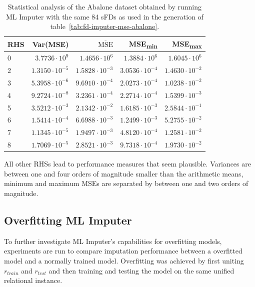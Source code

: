 \begin{table}[ht]
    \centering
    \begin{tabular}{lrrrr}
        \toprule
        \toprule
        RHS & Var(MSE) & \( \overline{\text{MSE}} \) & MSE\textsubscript{min} & MSE\textsubscript{max} \\
        \midrule
        0 & \(3.7736 \cdot 10^{9} \) & \(1.4656 \cdot 10^{6} \) & \(1.3884 \cdot 10^{6} \) & \(1.6045 \cdot 10^{6} \) \\
        2 & \( 1.3150 \cdot 10^{-5} \) & \( 1.5828 \cdot 10^{-3} \) & \( 3.0536 \cdot 10^{-4} \) & \( 1.4630 \cdot 10^{-2} \) \\
        3 & \( 5.3958 \cdot 10^{-6} \) & \( 9.6910 \cdot 10^{-4} \) & \( 2.0273 \cdot 10^{-4} \) & \( 1.0238 \cdot 10^{-2} \) \\
        4 & \( 9.2724 \cdot 10^{-8} \) & \( 3.2361 \cdot 10^{-4} \) & \( 2.2714 \cdot 10^{-4} \) & \( 1.5399 \cdot 10^{-3} \) \\
        5 & \( 3.5212 \cdot 10^{-3} \) & \( 2.1342 \cdot 10^{-2} \) & \( 1.6185 \cdot 10^{-3} \) & \( 2.5844 \cdot 10^{-1} \) \\
        6 & \( 1.5414 \cdot 10^{-4} \) & \( 6.6988 \cdot 10^{-3} \) & \( 1.2499 \cdot 10^{-3} \) & \( 5.2755 \cdot 10^{-2} \) \\
        7 & \( 1.1345 \cdot 10^{-5} \)& \( 1.9497 \cdot 10^{-3} \) & \( 4.8120 \cdot 10^{-4} \) & \( 1.2581 \cdot 10^{-2} \) \\
        8 & \( 1.7069 \cdot 10^{-5} \) & \( 2.8521 \cdot 10^{-3} \) & \( 9.7318 \cdot 10^{-4} \) & \( 1.9730 \cdot 10^{-2} \) \\
        \bottomrule
        \bottomrule
    \end{tabular}
    \caption{Statistical analysis of the Abalone dataset obtained by running ML Imputer with the same 84 sFDs as used in the generation of table~\ref{tab:fd-imputer-mse-abalone}.}\label{tab:ml-imputer-mse-abalone}
\end{table}

All other RHSs lead to performance measures that seem plausible.
Variances are between one and four orders of magnitude smaller than the arithmetic means, minimum and maximum MSEs are separated by between one and two orders of magnitude.

\subsection{Overfitting ML Imputer}
To further investigate ML Imputer's capabilities for overfitting models, experiments are run to compare imputation performance between a overfitted model and a normally trained model.
Overfitting was achieved by first uniting \( r_{train} \) and \( r_{test} \) and then training and testing the model on the same unified relational instance.

